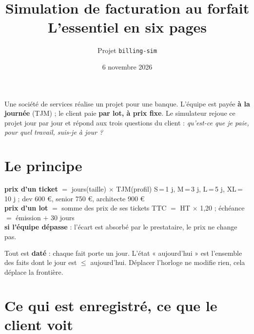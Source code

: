 \documentclass[11pt,a4paper]{article}
\title{\vspace{-1cm}Simulation de facturation au forfait\\\large L'essentiel en six pages}
\author{Projet \texttt{billing-sim}}
\date{6 novembre 2026}
\begin{document}
\maketitle
\vspace{-0.8cm}

\noindent Une société de services réalise un projet pour une banque. L'équipe est payée \textbf{à la journée} (TJM) ; le client paie \textbf{par lot, à prix fixe}. Le simulateur rejoue ce projet jour par jour et répond aux trois questions du client : \emph{qu'est-ce que je paie, pour quel travail, suis-je à jour ?}

\section{Le principe}

\begin{formules}
\textbf{prix d'un ticket} $=$ jours(taille) $\times$ TJM(profil) \hfill S\,=\,1 j, M\,=\,3 j, L\,=\,5 j, XL\,=\,10 j ; dev 600 €, senior 750 €, architecte 900 €\\
\textbf{prix d'un lot} $=$ somme des prix de ses tickets \hfill TTC $=$ HT $\times$ 1,20 ; échéance $=$ émission $+$ 30 jours\\
\textbf{si l'équipe dépasse} : l'écart est absorbé par le prestataire, le prix ne change pas.
\end{formules}

\noindent Tout est \textbf{daté} : chaque fait porte un jour. L'état « aujourd'hui » est l'ensemble des faits dont le jour est $\le$ aujourd'hui. Déplacer l'horloge ne modifie rien, cela déplace la frontière.

\section{Ce qui est enregistré, ce que le client voit}
\end{document}
